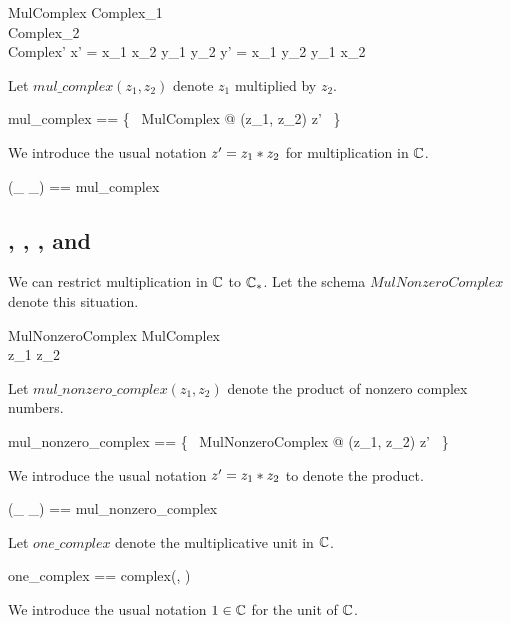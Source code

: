 \documentclass[11pt, oneside]{article}
\begin{document}
\begin{schema}{MulComplex}
	Complex_1 \\
	Complex_2 \\
	Complex'
\where
	x' = x_1 \mulR x_2 \subR y_1 \mulR y_2
\also
	y' = x_1 \mulR y_2 \addR y_1 \mulR x_2
\end{schema}

Let $mul\_complex(z_1, z_2)$ denote $z_1$ multiplied by $z_2$.

\begin{zed}
	mul\_complex == \{~ MulComplex @ (z_1, z_2) \mapsto z' ~\}
\end{zed}

We introduce the usual notation $z' = z_1 \mathbin{*} z_2$ for multiplication in $\mathbb{C}$.

\begin{zed}
	(\_ \mulC \_) == mul\_complex
\end{zed}

\subsection{, , , and }

We can restrict multiplication in $\mathbb{C}$ to $\mathbb{C}_{*}$.
Let the schema $MulNonzeroComplex$ denote this situation.

\begin{schema}{MulNonzeroComplex}
	MulComplex \\
\where
	z_1 \in \Cnz
\also
	z_2 \in \Cnz
\end{schema}

Let $mul\_nonzero\_complex(z_1, z_2)$ denote the product of nonzero complex numbers.

\begin{zed}
	mul\_nonzero\_complex == \{~ MulNonzeroComplex @ (z_1, z_2) \mapsto z' ~\}
\end{zed}

We introduce the usual notation $z' = z_1 \mathbin{*} z_2$ to denote the product.

\begin{zed}
	(\_ \mulCnz \_) == mul\_nonzero\_complex
\end{zed}

Let $one\_complex$ denote the multiplicative unit in $\mathbb{C}$.

\begin{zed}
	one\_complex == complex(\oneR, \zeroR)
\end{zed}

We introduce the usual notation $1 \in \mathbb{C}$ for the unit of $\mathbb{C}$.
\end{document}
